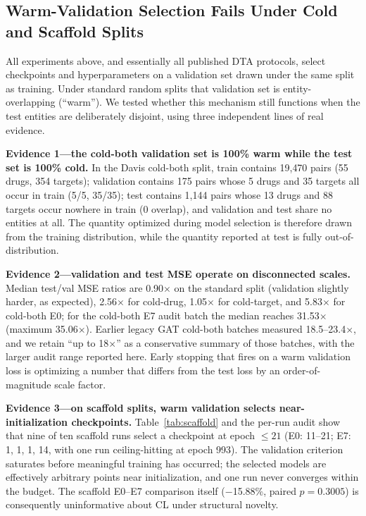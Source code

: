 \documentclass[10pt,a4paper,twocolumn]{article}
\begin{document}
\subsection{Warm-Validation Selection Fails Under Cold and Scaffold Splits}

All experiments above, and essentially all published DTA protocols, select checkpoints and hyperparameters on a validation set drawn under the same split as training. Under standard random splits that validation set is entity-overlapping (``warm''). We tested whether this mechanism still functions when the test entities are deliberately disjoint, using three independent lines of real evidence.

\textbf{Evidence 1---the cold-both validation set is 100\% warm while the test set is 100\% cold.} In the Davis cold-both split, train contains 19{,}470 pairs (55 drugs, 354 targets); validation contains 175 pairs whose 5 drugs and 35 targets all occur in train (5/5, 35/35); test contains 1{,}144 pairs whose 13 drugs and 88 targets occur nowhere in train (0 overlap), and validation and test share no entities at all. The quantity optimized during model selection is therefore drawn from the training distribution, while the quantity reported at test is fully out-of-distribution.

\textbf{Evidence 2---validation and test MSE operate on disconnected scales.} Median test/val MSE ratios are 0.90$\times$ on the standard split (validation slightly harder, as expected), 2.56$\times$ for cold-drug, 1.05$\times$ for cold-target, and 5.83$\times$ for cold-both E0; for the cold-both E7 audit batch the median reaches 31.53$\times$ (maximum 35.06$\times$). Earlier legacy GAT cold-both batches measured 18.5--23.4$\times$, and we retain ``up to 18$\times$'' as a conservative summary of those batches, with the larger audit range reported here. Early stopping that fires on a warm validation loss is optimizing a number that differs from the test loss by an order-of-magnitude scale factor.

\textbf{Evidence 3---on scaffold splits, warm validation selects near-initialization checkpoints.} Table~\ref{tab:scaffold} and the per-run audit show that nine of ten scaffold runs select a checkpoint at epoch $\leq 21$ (E0: 11--21; E7: 1, 1, 1, 14, with one run ceiling-hitting at epoch 993). The validation criterion saturates before meaningful training has occurred; the selected models are effectively arbitrary points near initialization, and one run never converges within the budget. The scaffold E0--E7 comparison itself ($-$15.88\%, paired $p=0.3005$) is consequently uninformative about CL under structural novelty.
\end{document}
